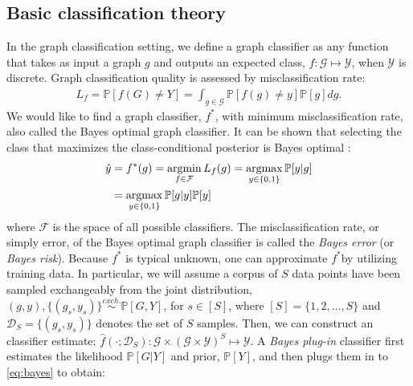 \documentclass[10pt,journal,cspaper,compsoc]{IEEEtran}
\providecommand{\mc}[1]{\mathcal{#1}}
\providecommand{\mh}[1]{\hat{#1}}
\newcommand{\PP}{\mathbb{P}}
\newcommand{\argmax}{\operatornamewithlimits{argmax}}
\newcommand{\argmin}{\operatornamewithlimits{argmin}}
\begin{document}

\subsection{Basic classification theory} %
\label{sub:basic_classification_theory}


In the graph classification setting, we define a graph classifier as any function that takes as input a graph $g$ and outputs an expected class, $f: \mc{G} \mapsto \mc{Y}$, when $\mc{Y}$ is discrete.  Graph classification quality is assessed by misclassification rate:
\begin{align} \label{eq:L}
	L_f = \PP[f(G) \neq Y] = \int_{g \in \mc{G}} \PP[f(g) \neq y]  \PP[g] dg.
\end{align}
We would like to find a graph classifier, $f^*$, with minimum misclassification rate, also called the Bayes optimal graph classifier. 
It can be shown that selecting the class that maximizes the class-conditional posterior is Bayes optimal \cite{DGL96}:
\begin{align} \label{eq:bayes}
	\mh{y} &= f^*(g) =\argmin_{f \in \mc{F}} L_f(g) = \argmax_{y \in \{0,1\}} \PP[y | g] 
	\\ &= \argmax_{y \in \{0,1\}} \PP[g | y] \PP[y]  
\end{align}
where $\mc{F}$ is the space of all possible classifiers. The misclassification rate, or simply error, of the Bayes optimal graph classifier is called the \emph{Bayes error} (or \emph{Bayes risk}).  Because $f^*$ is typical unknown, one can approximate $f^*$by utilizing training data. In particular, we will assume a corpus of $S$ data points have been sampled exchangeably from the joint distribution, $(g,y), \{(g_s,y_s)\} \overset{exch.}{\sim} \PP[G,Y]$, for $s \in [S]$, where $[S]=\{1,2,\ldots, S\}$ and
  $\mc{D}_S =\{(g_s,y_s)\}$ denotes the set of $S$ samples.  Then, we can construct an classifier estimate: $\mh{f}(\cdot; \mc{D}_S): \mc{G} \times (\mc{G} \times \mc{Y})^S \mapsto \mc{Y}$.  
A \emph{Bayes plug-in} classifier first estimates the likelihood $\PP[G|Y]$ and prior, $\PP[Y]$, and then plugs them in to \eqref{eq:bayes} to obtain:
\end{document}
